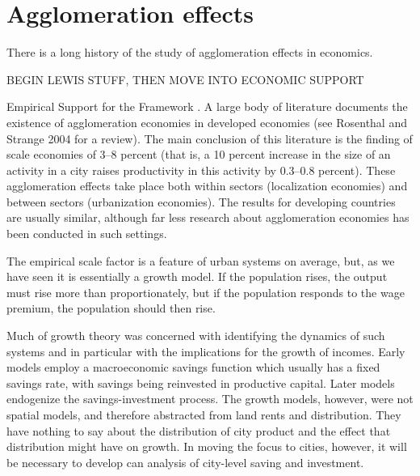 \section{Agglomeration effects}

There is a long history of the study of agglomeration effects in economics. 

BEGIN LEWIS STUFF, THEN MOVE INTO ECONOMIC SUPPORT

Empirical Support for the Framework \cite{spenceUrbanizationGrowth2009, durantonAreCitiesEngines2009, durantonHumanCapitalExternalities2007}. 
A large body of literature documents the existence of agglomeration economies in developed economies (see Rosenthal and Strange 2004 for a review). The main conclusion of this literature is the finding of scale economies of 3--8 percent (that is, a 10 percent increase in the size of an activity in a city raises productivity in this activity by 0.3--0.8 percent). These agglomeration effects take place both within sectors (localization economies) and between sectors (urbanization economies). The results for developing countries are usually similar, although far less research about agglomeration economies has been conducted in such settings.

The empirical scale factor is a feature of urban systems on average, but, as we have seen it is essentially a growth model. If the population rises, the output must rise more than proportionately, but if the population responds to the wage premium, the population should then rise. 

Much of growth theory was concerned with identifying the dynamics of such systems and in particular with the implications for the growth of incomes. Early models employ a macroeconomic savings function which usually has a fixed savings rate, with savings being reinvested in productive capital. Later models endogenize the savings-investment process. The growth models, however, were not spatial models, and therefore abstracted from land rents and distribution. They have nothing to say about the distribution of city product and the effect that distribution might have on growth. In moving the focus to cities, however, it will be necessary to develop can analysis of city-level saving and investment. 



